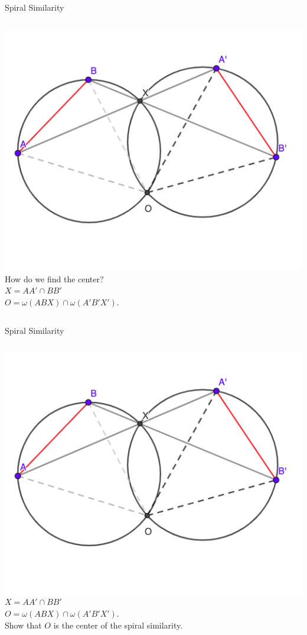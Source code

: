 \documentclass{beamer}
\begin{document}
\begin{frame}{Spiral Similarity}
	\begin{columns}
		\includegraphics[scale=0.37]{spi2.png}
		How do we find the center?\\
		\phantom{Spacing}
		$X = A A'\cap BB'$ \\
		$O = \omega(ABX) \cap \omega(A'B'X')$.
	\end{columns}
\end{frame}
\begin{frame}{Spiral Similarity}
	\begin{columns}
		\column{0.6\textwidth}
		\includegraphics[scale=0.37]{spi2.png}
		\column{0.4\textwidth}
		$X = A A'\cap BB'$ \\
		$O = \omega(ABX) \cap \omega(A'B'X')$.\\
		\phantom{Spacing}
		Show that $O$ is the center of the spiral similarity.
	\end{columns}
\end{frame}
\end{document}
